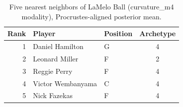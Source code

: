 \begin{table}[htbp]
  \centering\small
  \begin{tabular}{rllc}
    \toprule
    Rank & Player & Position & Archetype \\
    \midrule
    1 & Daniel Hamilton & G & 4 \\
    2 & Leonard Miller & F & 2 \\
    3 & Reggie Perry & F & 4 \\
    4 & Victor Wembanyama & C & 4 \\
    5 & Nick Fazekas & F & 4 \\
    \bottomrule
  \end{tabular}
  \caption{Five nearest neighbors of LaMelo Ball (curvature_m4 modality), Procrustes-aligned posterior mean.}
  \label{tab:LaMelo_Ball_neighbors_curvature_m4}
\end{table}

